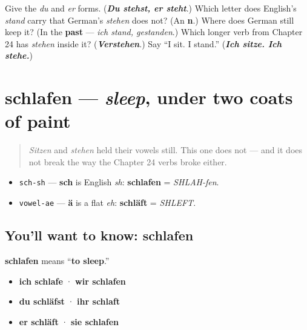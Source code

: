 \begin{tcolorbox}[breakable,colback=teal!4,colframe=teal!35!black,title={Before you move on}]
Give the \emph{du} and \emph{er} forms. (\emph{\textbf{Du stehst, er steht}}.) Which letter does English's \emph{stand} carry that German's \emph{stehen} does not? (An \textbf{n}.) Where does German still keep it? (In the \textbf{past} — \emph{ich stand, gestanden}.) Which longer verb from Chapter 24 has \emph{stehen} inside it? (\emph{\textbf{Verstehen}}.) Say \textquotedblleft{}I sit. I stand.\textquotedblright{} (\emph{\textbf{Ich sitze. Ich stehe.}})
\end{tcolorbox}
\section[schlafen]{schlafen — \emph{sleep}, under two coats of paint}

\label{lesson:GE-C26-schlafen}



\begin{quote}
\emph{Sitzen} and \emph{stehen} held their vowels still. This one does not — and it does not break the way the Chapter 24 verbs broke either.
\end{quote}

\begin{sounds}
\begin{itemize}
\raggedright
  \item \texttt{sch-sh} — \textbf{sch} is English \emph{sh}: \textbf{schlafen} = \emph{SHLAH-fen}.
  \item \texttt{vowel-ae} — \textbf{ä} is a flat \emph{eh}: \textbf{schläft} = \emph{SHLEFT}.
\end{itemize}
\end{sounds}

\subsection*{You'll want to know: schlafen}
\textbf{schlafen} means \textquotedblleft{}\textbf{to sleep}.\textquotedblright{}

\begin{itemize}
\raggedright
  \item \textbf{ich schlafe} · \textbf{wir schlafen}
  \item \textbf{du schläfst} · \textbf{ihr schlaft}
  \item \textbf{er schläft} · \textbf{sie schlafen}
\end{itemize}

